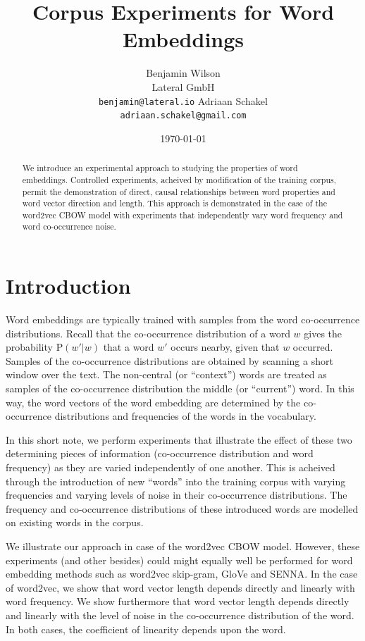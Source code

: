 \documentclass{article} %
\title{Corpus Experiments for Word Embeddings}
\author{
 	Benjamin Wilson\\
	Lateral GmbH\\
	\texttt{benjamin@lateral.io}
	\And
	Adriaan Schakel\\
	\texttt{adriaan.schakel@gmail.com}
 }
\date{\today}
\newcommand{\p}{\text{P}}
\begin{document}
\graphicspath{{../outputs/}}
\maketitle


\begin{abstract}
	We introduce an experimental approach to studying the properties of word embeddings.
	Controlled experiments, acheived by modification of the training corpus, permit the demonstration of direct, causal relationships between word properties and word vector direction and length.
	This approach is demonstrated in the case of the word2vec CBOW model with experiments that independently vary word frequency and word co-occurrence noise.
\end{abstract} 

\section{Introduction}
Word embeddings are typically trained with samples from the word co-occurrence distributions.
Recall that the co-occurrence distribution of a word $w$ gives the probability $\p(w'|w)$ that a word $w'$ occurs nearby, given that $w$ occurred.
Samples of the co-occurrence distributions are obtained by scanning a short window over the text.
The non-central (or ``context'') words are treated as samples of the co-occurrence distribution the middle (or ``current'') word. 
In this way, the word vectors of the word embedding are determined by the co-occurrence distributions and frequencies of the words in the vocabulary.

In this short note, we perform experiments that illustrate the effect of these two determining pieces of information (co-occurrence distribution and word frequency) as they are varied independently of one another.
This is acheived through the introduction of new ``words'' into the training corpus with varying frequencies and varying levels of noise in their co-occurrence distributions.
The frequency and co-occurrence distributions of these introduced words are modelled on existing words in the corpus.

We illustrate our approach in case of the word2vec CBOW model.
However, these experiments (and other besides) could might equally well be performed for word embedding methods such as word2vec skip-gram, GloVe and SENNA.  \cite{}
In the case of word2vec, we show that word vector length depends directly and linearly with word frequency.
We show furthermore that word vector length depends directly and linearly with the level of noise in the co-occurrence distribution of the word.
In both cases, the coefficient of linearity depends upon the word.
\end{document}
